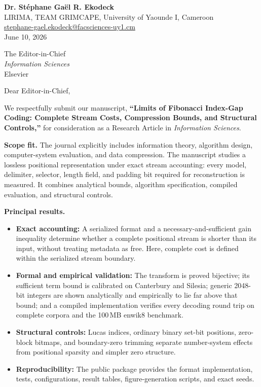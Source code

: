 \documentclass[10pt,a4paper]{article}
\newcommand{\lead}[1]{\textcolor{sectionblue}{\textbf{#1}}}
\begin{document}
\fontsize{9.75}{10.35}\selectfont
\justifying

\begin{flushright}
\textbf{\fontsize{10.5}{11}\selectfont Dr. St\'ephane Ga\"el R. Ekodeck}\\
LIRIMA, TEAM GRIMCAPE, University of Yaounde I, Cameroon\\
\href{mailto:stephane-gael.ekodeck@facsciences-uy1.cm}{stephane-gael.ekodeck@facsciences-uy1.cm}\\
June 10, 2026
\end{flushright}
\vspace{-1.5mm}

The Editor-in-Chief\\
\textit{Information Sciences}\\
Elsevier

\vspace{1mm}
Dear Editor-in-Chief,

We respectfully submit our manuscript, \textbf{``Limits of Fibonacci
Index-Gap Coding: Complete Stream Costs, Compression Bounds, and Structural
Controls,''} for consideration as a Research Article
in \textit{Information Sciences}.

\lead{Scope fit.} The journal explicitly includes information theory,
algorithm design, computer-system evaluation, and data compression. The
manuscript studies a lossless positional representation under exact stream
accounting: every model, delimiter, selector, length field, and padding bit
required for reconstruction is measured. It combines analytical bounds,
algorithm specification, compiled evaluation, and structural controls.

\lead{Principal results.}
\begin{itemize}
  \item \textbf{Exact accounting:} A serialized format and a
  necessary-and-sufficient gain inequality determine whether a complete
  positional stream is shorter than its input, without treating metadata as
  free. Here, complete cost is defined within the serialized stream boundary.
  \item \textbf{Formal and empirical validation:} The transform is proved
  bijective; its sufficient term bound is calibrated on Canterbury and
  Silesia; generic 2048-bit integers are shown analytically and empirically to
  lie far above that bound; and a compiled implementation verifies every
  decoding round trip on complete corpora and the 100\,MB enwik8 benchmark.
  \item \textbf{Structural controls:} Lucas indices, ordinary binary set-bit
  positions, zero-block bitmaps, and boundary-zero trimming separate
  number-system effects from positional sparsity and simpler zero structure.
  \item \textbf{Reproducibility:} The public package provides the format
  implementation, tests, configurations, result tables, figure-generation
  scripts, and exact seeds.
\end{itemize}
\end{document}
